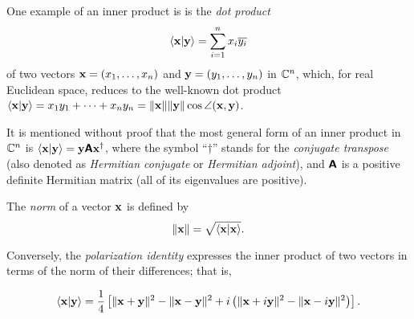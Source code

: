 {
\color{blue}
\bexample
One example of an inner product is is the
{\em dot product}
\begin{equation}
\langle  {\bf x} \vert {\bf y} \rangle
=
\sum_{i=1}^n x_i\overline{y_i}
\end{equation}
of two vectors ${\bf x}=
(x_1,\ldots , x_n)$
and
${\bf y}=
(y_1,\ldots , y_n)$ in ${\Bbb C}^n$,
which, for real Euclidean space,  reduces to the well-known dot product
$\langle  {\bf x} \vert {\bf y} \rangle
=
{x_1}y_1 + \cdots + {x_n}y_n  = \| {\bf x}\| \| {\bf y}\| \cos \angle ({\bf x},{\bf y})$.


It is mentioned without proof that the most general form of an inner product in ${\Bbb C}^n$
is
$\langle  {\bf x} \vert {\bf y} \rangle
=  {\bf y} \textsf{\textbf{A}} {\bf x}^\dagger$,
where the symbol ``$\dagger$'' stands for the {\em conjugate transpose} (also denoted as
{\em Hermitian conjugate} or {\em Hermitian adjoint}),
and $ \textsf{\textbf{A}} $ is a positive definite Hermitian matrix (all of its eigenvalues are positive).
\eexample
}



The {\em norm} of a vector ${\bf x}$
is defined by
\begin{equation}
\|
{\bf x}
\|
=\sqrt{\langle {\bf x}\vert {\bf x}\rangle }
.
\end{equation}

Conversely, the {\em polarization identity}
expresses the inner product of two vectors in terms of the norm of their differences; that is,

\begin{equation}
\langle {\bf x}\vert {\bf y}\rangle
=
\frac{1}{4}\left[
\|  {\bf x}+ {\bf y} \|^2
-
\|  {\bf x}- {\bf y} \|^2
+ i
\left(
\|  {\bf x}+ i{\bf y} \|^2
-
\|  {\bf x}- i{\bf y} \|^2
\right)
\right]
.
\label{2015-m-ch-polidc}
\end{equation}


